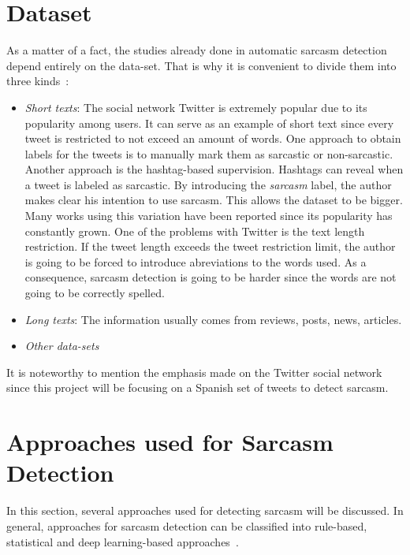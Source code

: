 \section{Dataset}

As a matter of a fact, the studies already done in automatic sarcasm detection depend entirely on the data-set. That is why it is convenient to divide them into three kinds~\cite{joshi2017automatic}:
\begin{itemize}
	\item \textit{Short texts}: The social network Twitter is extremely popular due to its popularity among users. It can serve as an example of short text since every tweet is restricted to not exceed an amount of words. One approach to obtain labels for the tweets is to manually mark them as sarcastic or non-sarcastic. Another approach is the hashtag-based supervision. Hashtags can reveal when a tweet is labeled as sarcastic. By introducing the \textit{sarcasm} label, the author makes clear his intention to use sarcasm.  This allows the dataset to be bigger. Many works using this variation have been reported since its popularity has constantly grown. One of the problems with Twitter is the text length restriction. If the tweet length exceeds the tweet restriction limit, the author is going to be forced to introduce abreviations to the words used. As a consequence, sarcasm detection is going to be harder since the words are not going to be correctly spelled.
	\item \textit{Long texts}: The information usually comes from reviews, posts, news, articles. 
	\item \textit{Other data-sets}
\end{itemize}

It is noteworthy to mention the emphasis made on the Twitter social network since this project will be focusing on a Spanish set of tweets to detect sarcasm. 

\section{Approaches used for Sarcasm Detection}
In this section, several approaches used for detecting sarcasm will be discussed. In general, approaches for sarcasm detection can be classified into rule-based, statistical and deep learning-based approaches~\cite{joshi2017automatic}.
